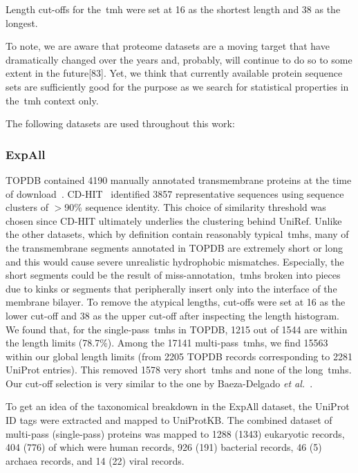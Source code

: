 Length cut-offs for the~\gls{tmh} were set at 16 as the shortest length and 38 as the longest.

To note, we are aware that proteome datasets are a moving target that have dramatically changed over the years and, probably, will continue to do so to some extent in the future[83].
Yet, we think that currently available protein sequence sets are sufficiently good for the purpose as we search for statistical properties in the~\gls{tmh} context only.

The following datasets are used throughout this work:

\subsubsection{ExpAll}

TOPDB contained 4190 manually annotated transmembrane proteins at the time of download~\cite{Dobson2015}.
CD-HIT~\cite{Huang2010} identified 3857 representative sequences using sequence clusters of $>$90\% sequence identity.
This choice of similarity threshold was chosen since CD-HIT ultimately underlies the clustering behind UniRef.
Unlike the other datasets, which by definition contain reasonably typical~\gls{tmh}s, many of the transmembrane segments annotated in TOPDB are extremely short or long and this would cause severe unrealistic hydrophobic mismatches.
Especially, the short segments could be the result of miss-annotation,~\gls{tmh}s broken into pieces due to kinks or segments that peripherally insert only into the interface of the membrane bilayer.
To remove the atypical lengths, cut-offs were set at 16 as the lower cut-off and 38 as the upper cut-off after inspecting the length histogram.
We found that, for the single\--pass~\gls{tmh}s in TOPDB, 1215 out of 1544 are within the length limits (78.7\%).
Among the 17141 multi\--pass~\gls{tmh}s, we find 15563 within our global length limits (from 2205 TOPDB records corresponding to 2281 UniProt entries).
This removed 1578 very short~\gls{tmh}s and none of the long~\gls{tmh}s.
Our cut-off selection is very similar to the one by Baeza-Delgado \textit{et al.}~\cite{Baeza-Delgado2013}.

To get an idea of the taxonomical breakdown in the ExpAll dataset, the UniProt ID tags were extracted and mapped to UniProtKB.
The combined dataset of multi\--pass (single\--pass) proteins was mapped to 1288 (1343) eukaryotic records, 404 (776) of which were human records, 926 (191) bacterial records, 46 (5) archaea records, and 14 (22) viral records.


